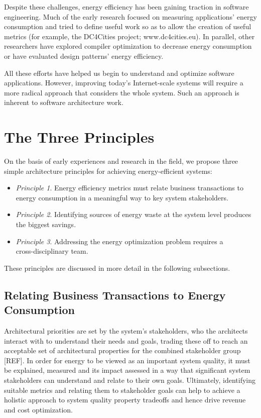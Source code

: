 Despite these challenges, energy efficiency has been gaining traction in software engineering. Much of the early research focused on measuring applications' energy consumption \cite{islam2016-energysoftwarefeatures} and tried to define useful work so as to allow the creation of useful metrics (for example, the DC4Cities project; www.dc4cities.eu). In parallel, other researchers have explored compiler optimization to decrease energy consumption or have evaluated design patterns' energy efficiency.

All these efforts have helped us begin to understand and optimize software applications. However, improving today's Internet-scale systems will require a more radical approach that considers the whole system. Such an approach is inherent to software architecture work.

\section{The Three Principles}

On the basis of early experiences and research in the field, we propose three simple architecture principles for achieving energy-efficient systems:

\begin{itemize}
\item \emph{Principle 1}. Energy efficiency metrics must relate business transactions to energy consumption in a meaningful way to key system stakeholders.
\item \emph{Principle 2}. Identifying sources of energy waste at the system level produces the biggest savings.
\item \emph{Principle 3}. Addressing the energy optimization problem requires a \\ cross-disciplinary team.
\end{itemize}

These principles are discussed in more detail in the following subsections. 

\subsection{Relating Business Transactions to Energy Consumption}

Architectural priorities are set by the system's stakeholders, who the architects interact with to understand their needs and goals, trading these off to reach an acceptable set of architectural properties for the combined stakeholder group [REF].  In order for energy to be viewed as an important system quality, it must be explained, measured and its impact assessed in a way that significant system stakeholders can understand and relate to their own goals.  Ultimately, identifying suitable metrics and relating them to stakeholder goals can help to achieve a holistic approach to system quality property tradeoffs and hence drive revenue and cost optimization.

